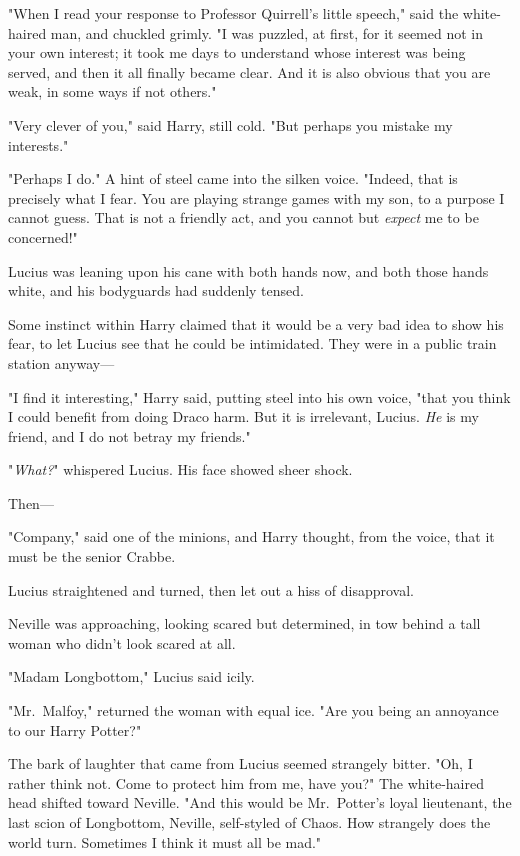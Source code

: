 "When I read your response to Professor Quirrell's little speech," said the
white-haired man, and chuckled grimly. "I was puzzled, at first, for it seemed
not in your own interest; it took me days to understand whose interest was
being served, and then it all finally became clear. And it is also obvious that
you are weak, in some ways if not others."

"Very clever of you," said Harry, still cold. "But perhaps you mistake my
interests."

"Perhaps I do." A hint of steel came into the silken voice. "Indeed, that is
precisely what I fear. You are playing strange games with my son, to a purpose
I cannot guess. That is not a friendly act, and you cannot but \emph{expect} me
to be concerned!"

Lucius was leaning upon his cane with both hands now, and both those hands
white, and his bodyguards had suddenly tensed.

Some instinct within Harry claimed that it would be a very bad idea to show his
fear, to let Lucius see that he could be intimidated. They were in a public
train station anyway---

"I find it interesting," Harry said, putting steel into his own voice, "that
you think I could benefit from doing Draco harm. But it is irrelevant, Lucius.
\emph{He} is my friend, and I do not betray my friends."

"\emph{What?}" whispered Lucius. His face showed sheer shock.

Then---

"Company," said one of the minions, and Harry thought, from the voice, that it
must be the senior Crabbe.

Lucius straightened and turned, then let out a hiss of disapproval.

Neville was approaching, looking scared but determined, in tow behind a tall
woman who didn't look scared at all.

"Madam Longbottom," Lucius said icily.

"Mr.~Malfoy," returned the woman with equal ice. "Are you being an annoyance to
our Harry Potter?"

The bark of laughter that came from Lucius seemed strangely bitter. "Oh, I
rather think not. Come to protect him from me, have you?" The white-haired head
shifted toward Neville. "And this would be Mr.~Potter's loyal lieutenant, the
last scion of Longbottom, Neville, self-styled of Chaos. How strangely does the
world turn. Sometimes I think it must all be mad."

